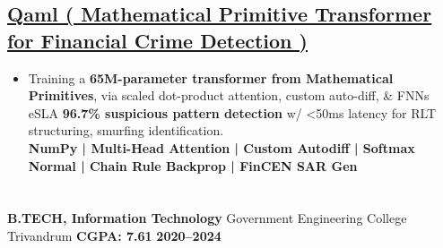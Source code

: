 \documentclass[11pt]{article}
\begin{document}
\subsection*{\uline{\href{https://github.com/davidgracemann/qaml}{Qaml ( Mathematical Primitive Transformer for Financial Crime Detection )}}}
\begin{itemize}[itemsep=0.1ex,leftmargin=*,topsep=0pt]
 \item Training a \textbf{65M-parameter transformer from Mathematical Primitives}, via scaled dot-product attention, custom auto-diff, \& FNNs eSLA \textbf{96.7\% suspicious pattern detection } w/ <50ms latency for RLT structuring, smurfing identification.\\
 \textbf{ NumPy | Multi-Head Attention | Custom Autodiff | Softmax Normal | Chain Rule Backprop | FinCEN SAR Gen}
\end{itemize}
\section*{}
\noindent
\large
\textbf{B.TECH, Information Technology}%
\hfill Government Engineering College Trivandrum%
\hfill \textbf{CGPA: 7.61}%
\hfill \textbf{2020--2024}
\normalsize
\end{document}
